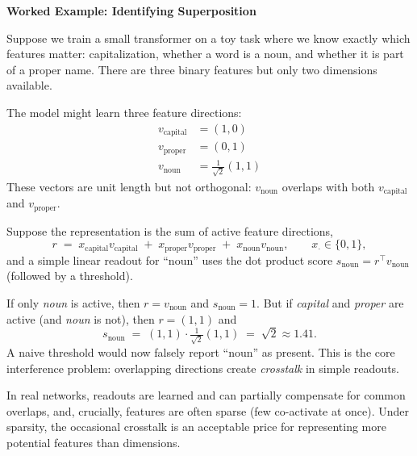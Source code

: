 \begin{examplebox}
\textbf{Worked Example: Identifying Superposition}

Suppose we train a small transformer on a toy task where we know exactly which features matter: capitalization, whether a word is a noun, and whether it is part of a proper name. There are three binary features but only two dimensions available.

\vspace{0.5em}

The model might learn three feature directions:
\begin{align*}
v_{\text{capital}} &= (1, 0) \\
v_{\text{proper}} &= (0, 1) \\
v_{\text{noun}} &= \tfrac{1}{\sqrt{2}}(1, 1)
\end{align*}
These vectors are unit length but not orthogonal: $v_{\text{noun}}$ overlaps with both $v_{\text{capital}}$ and $v_{\text{proper}}$.

\vspace{0.5em}

Suppose the representation is the sum of active feature directions,
\[
r \;=\; x_{\text{capital}}v_{\text{capital}} \;+\; x_{\text{proper}}v_{\text{proper}} \;+\; x_{\text{noun}}v_{\text{noun}},
\qquad x_\cdot\in\{0,1\},
\]
and a simple linear readout for ``noun'' uses the dot product score $s_{\text{noun}} = r^\top v_{\text{noun}}$ (followed by a threshold).

\vspace{0.5em}

If only \emph{noun} is active, then $r=v_{\text{noun}}$ and $s_{\text{noun}} = 1$.
But if \emph{capital} and \emph{proper} are active (and \emph{noun} is not), then $r=(1,1)$ and
\[
s_{\text{noun}} \;=\; (1,1)\cdot \tfrac{1}{\sqrt{2}}(1,1) \;=\; \sqrt{2}\approx 1.41.
\]
A naive threshold would now falsely report ``noun'' as present. This is the core interference problem: overlapping directions create \emph{crosstalk} in simple readouts.

\vspace{0.5em}

In real networks, readouts are learned and can partially compensate for common overlaps, and, crucially, features are often sparse (few co-activate at once). Under sparsity, the occasional crosstalk is an acceptable price for representing more potential features than dimensions.
\end{examplebox}


